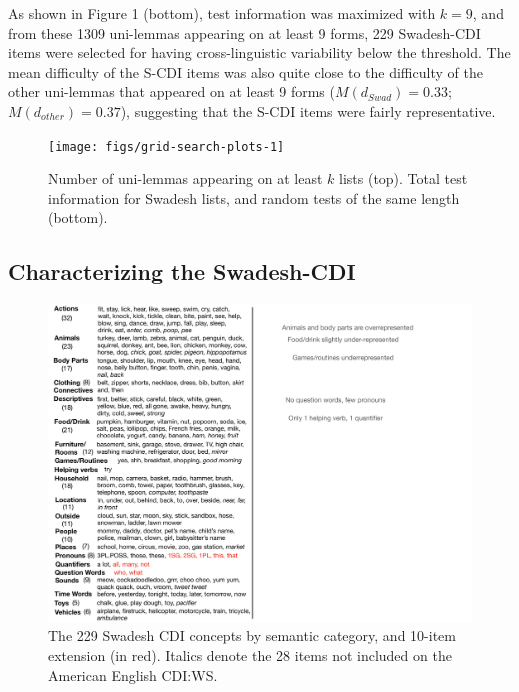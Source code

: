 \documentclass[10pt, letterpaper]{article}
\newenvironment{CodeChunk}{}{}
\begin{document}
As shown in Figure 1 (bottom), test information was maximized with
\(k=9\), and from these 1309 uni-lemmas appearing on at least 9 forms,
229 Swadesh-CDI items were selected for having cross-linguistic
variability below the threshold. The mean difficulty of the S-CDI items
was also quite close to the difficulty of the other uni-lemmas that
appeared on at least 9 forms (\(M(d_{Swad})=0.33\);
\(M(d_{other})=0.37\)), suggesting that the S-CDI items were fairly
representative.

\begin{CodeChunk}
\begin{figure}[tb]
\texttt{[image: figs/grid-search-plots-1]} \caption[Number of uni-lemmas appearing on at least $k$ lists (top)]{Number of uni-lemmas appearing on at least $k$ lists (top). Total test information for Swadesh lists, and random tests of the same length (bottom).}\label{fig:grid-search-plots}
\end{figure}
\end{CodeChunk}

\hypertarget{characterizing-the-swadesh-cdi}{%
\subsection{Characterizing the
Swadesh-CDI}\label{characterizing-the-swadesh-cdi}}

\begin{CodeChunk}
\begin{figure}[tb]

{\centering \includegraphics[width=\linewidth]{figs/SwadeshCDI_list} 

}

\caption[The 229 Swadesh CDI concepts by semantic category, and 10-item extension (in red)]{The 229 Swadesh CDI concepts by semantic category, and 10-item extension (in red). Italics denote the 28 items not included on the American English CDI:WS.}\label{fig:unnamed-chunk-5}
\end{figure}
\end{CodeChunk}
\end{document}
